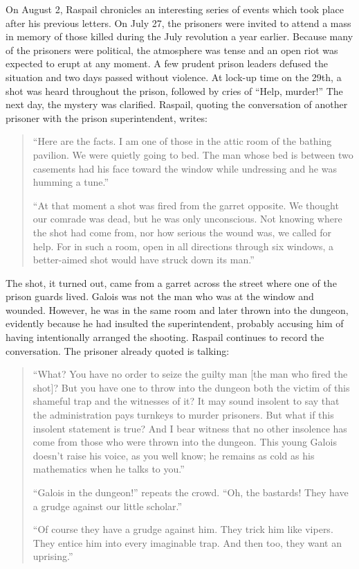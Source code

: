 \documentclass[12pt]{article}
\begin{document}
On August 2, Raspail chronicles an interesting series of events which took place after his previous letters. On July 27, the prisoners were invited to attend a mass in memory of those killed during the July revolution a year earlier. Because many of the prisoners were political, the atmosphere was tense and an open riot was expected to erupt at any moment. A few prudent prison leaders defused the situation and two days passed without violence. At lock-up time on the 29th, a shot was heard throughout the prison, followed by cries of ``Help, murder!'' The next day, the mystery was clarified. Raspail, quoting the conversation of another prisoner with the prison superintendent, writes:

\begin{quotation}
``Here are the facts. I am one of those in the attic room of the bathing pavilion. We were quietly going to bed. The man whose bed is between two casements had his face toward the window while undressing and he was humming a tune.''

``At that moment a shot was fired from the garret opposite. We thought our comrade was dead, but he was only unconscious. Not knowing where the shot had come from, nor how serious the wound was, we called for help. For in such a room, open in all directions through six windows, a better-aimed shot would have struck down its man.'' \cite{68}
\end{quotation}

The shot, it turned out, came from a garret across the street where one of the prison guards lived. Galois was not the man who was at the window and wounded. However, he was in the same room and later thrown into the dungeon, evidently because he had insulted the superintendent, probably accusing him of having intentionally arranged the shooting. Raspail continues to record the conversation. The prisoner already quoted is talking:

\begin{quotation}

``What? You have no order to seize the guilty man [the man who fired the shot]? But you have one to throw into the dungeon both the victim of this shameful trap and the witnesses of it? It may sound insolent to say that the administration pays turnkeys to murder prisoners. But what if this insolent statement is true? And I bear witness that no other insolence has come from those who were thrown into the dungeon. This young Galois doesn't raise his voice, as you well know; he remains as cold as his mathematics when he talks to you.''

``Galois in the dungeon!'' repeats the crowd. ``Oh, the bastards! They have a grudge against our little scholar.''

``Of course they have a grudge against him. They trick him like vipers. They entice him into every imaginable trap. And then too, they want an uprising.'' \cite{69}

\end{quotation}
\end{document}
